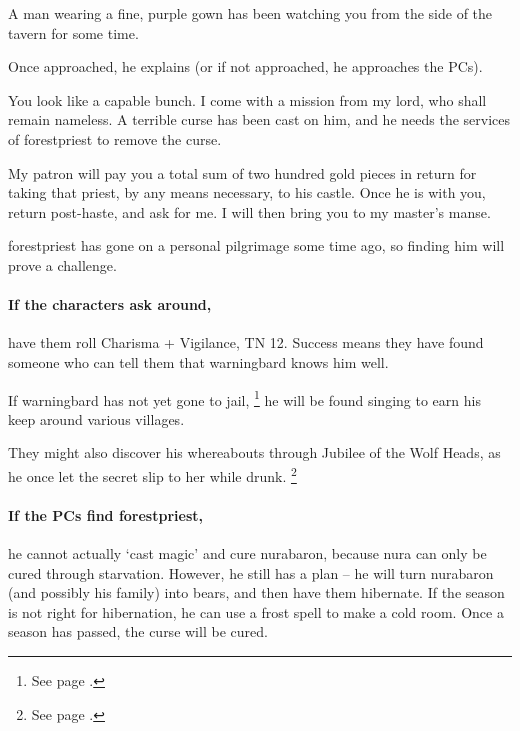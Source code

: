\begin{multicols}{2}
\stopcontents[Town]

\begin{boxtext}

  A man wearing a fine, purple gown has been watching you from the side of the tavern for some time.

\end{boxtext}

Once approached, he explains (or if not approached, he approaches the PCs).

\begin{speechtext}

  You look like a capable bunch.
  I come with a mission from my lord, who shall remain nameless.
  A terrible curse has been cast on him, and he needs the services of \gls{forestpriest} to remove the curse.

  My patron will pay you a total sum of two hundred gold pieces in return for taking that priest, by any means necessary, to his castle.
  Once he is with you, return post-haste, and ask for me.
  I will then bring you to my master's manse.

\end{speechtext}

\Gls{forestpriest} has gone on a personal pilgrimage some time ago, so finding him will prove a challenge.

\paragraph{If the characters ask around,}
have them roll Charisma + Vigilance, TN 12.
Success means they have found someone who can tell them that \gls{warningbard} knows him well.

If \gls{warningbard} has not yet gone to jail,%
\footnote{See page \pageref{warningbard}.}
he will be found singing to earn his keep around various villages.

They might also discover his whereabouts through Jubilee of the Wolf Heads, as he once let the secret slip to her while drunk.%
\footnote{See page \pageref{jubilee}.}

\paragraph{If the PCs find \gls{forestpriest},}
he cannot actually `cast magic' and cure \gls{nurabaron}, because nura can only be cured through starvation.
However, he still has a plan -- he will turn \gls{nurabaron} (and possibly his family) into bears, and then have them hibernate.
If the season is not right for hibernation, he can use a frost spell to make a cold room.
Once a season has passed, the curse will be cured.


\end{multicols}
